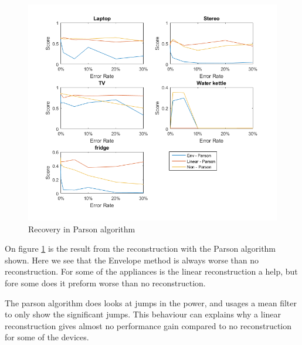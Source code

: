 \newpage

\begin{figure}[H]
\centering
\includegraphics[width=1\textwidth]{billeder/Rec-Parson.png}
\caption{Recovery in Parson algorithm}
\label{fig:ERPARSON}
\end{figure}

On figure \ref{fig:ERPARSON} is the result from the reconstruction with the Parson algorithm shown. Here we see that the Envelope method is always worse than no reconstruction. For some of the appliances is the linear reconstruction a help, but fore some does it preform worse than no reconstruction. 

The parson algorithm does looks at jumps in the power, and usages a mean filter to only show the significant jumps. This behaviour can explains why a linear reconstruction gives almost no performance gain compared to no reconstruction for some of the devices.
 
